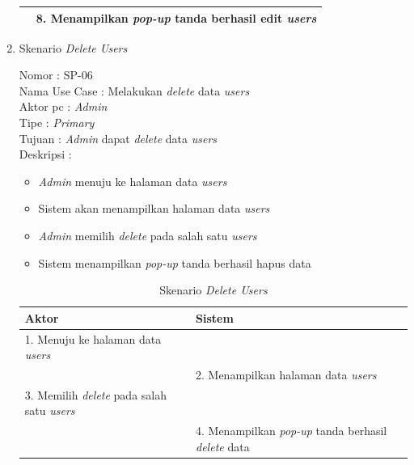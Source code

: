 \begin{enumerate}
\begin{table}
\begin{tabular}{ | l | p{65mm} |}
		& 8.	Menampilkan \textit{pop-up} tanda berhasil edit \textit{users} \\
		\hline
		
	\end{tabular}
\end{table}

\newpage

\item Skenario \textit{Delete Users}

Nomor \kern 3.6pc : SP-06 \\
Nama Use Case : Melakukan \textit{delete} data \textit{users} \\
Aktor  pc : \textit{Admin} \\
Tipe \kern 4.6pc : \textit{Primary} \\
Tujuan \kern 3.6pc : \textit{Admin} dapat \textit{delete} data \textit{users} \\
Deskripsi \kern 2.5pc : 

\begin{itemize}
	\item \textit{Admin} menuju ke halaman data \textit{users}
	\item Sistem akan menampilkan halaman data \textit{users}
	\item \textit{Admin} memilih \textit{delete} pada salah satu \textit{users}
	\item Sistem menampilkan \textit{pop-up} tanda berhasil hapus data
	
\end{itemize}

\begin{table}
	\caption{Skenario \textit{Delete Users}}
	\centering
	\begin{tabular}{ | l | p{61mm} |}
		\hline 
		\textbf{Aktor} & \textbf{Sistem} \\
		\hline
		
		1.	Menuju ke halaman data \textit{users} &  \\
		
		\hline
		
		&  2.	Menampilkan halaman data \textit{users} \\
		
		\hline
		
		3. Memilih \textit{delete} pada salah satu \textit{users} & \\
		
		\hline
		
		& 4.	Menampilkan \textit{pop-up} tanda berhasil \textit{delete} data \\
		

\end{tabular}
\end{table}
\end{enumerate}
